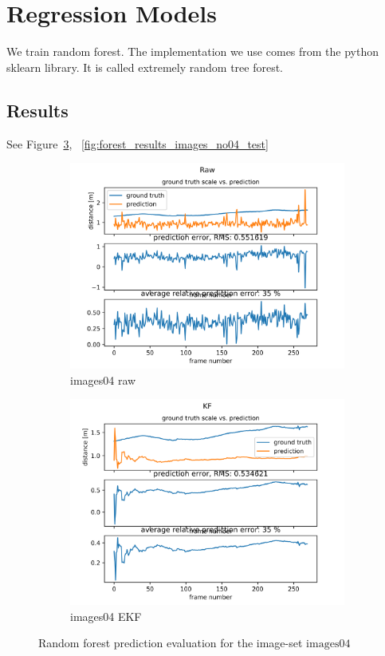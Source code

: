 \documentclass{article}
\begin{document}
\section{Regression Models}

We train random forest. The implementation we use comes from the python sklearn library.  It is called extremely random tree forest.

\subsection{Results}

See Figure~\ref{fig:forest_results_images4}, ~\ref{fig:forest_results_images_no04_test}

\begin{figure}[h!]
	\begin{subfigure}{.5\textwidth}
		\includegraphics[width=\linewidth]{images4_test_raw}
		\caption{images04 raw}		
		\label{fig:ETR_images4_test_raw}
	\end{subfigure}
	\begin{subfigure}{.5\textwidth}
		\includegraphics[width=\linewidth]{images4_test_smooth}
		\caption{images04 EKF}		
		\label{fig:images4_test_smooth}
	\end{subfigure}
	\caption{Random forest prediction evaluation for the image-set $\mathrm{images04}$}
	\label{fig:forest_results_images4}
\end{figure}
\end{document}
